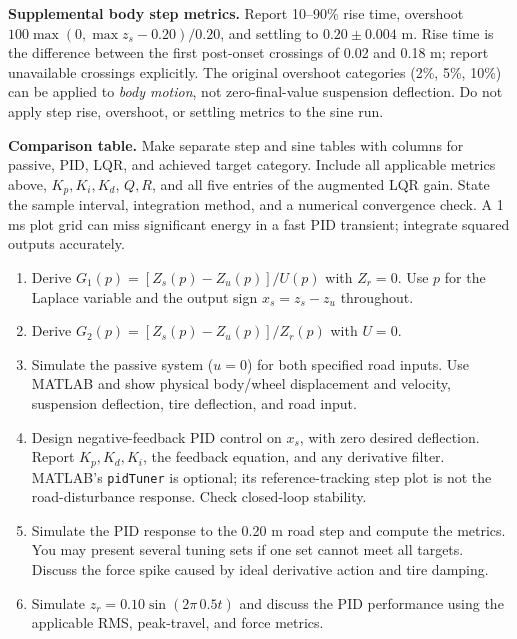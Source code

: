 \textbf{Supplemental body step metrics.} Report 10--90\% rise time, overshoot
$100\max(0,\max z_s-0.20)/0.20$, and settling to $0.20\pm0.004$ m.
Rise time is the difference between the first post-onset crossings of 0.02 and 0.18 m;
report unavailable crossings explicitly. The original overshoot categories (2\%, 5\%,
10\%) can be applied to \emph{body motion}, not zero-final-value suspension deflection.
Do not apply step rise, overshoot, or settling metrics to the sine run.

\textbf{Comparison table.} Make separate step and sine tables with columns for
passive, PID, LQR, and achieved target category. Include all applicable metrics above,
$K_p,K_i,K_d$, $Q,R$, and all five entries of the augmented LQR gain. State the sample
interval, integration method, and a numerical convergence check. A 1 ms plot grid can
miss significant energy in a fast PID transient; integrate squared outputs accurately.
\newpage
{}
\begin{enumerate}[label=\textbf{(\alph*)}]
\item Derive $G_1(p)=[Z_s(p)-Z_u(p)]/U(p)$ with $Z_r=0$.
Use $p$ for the Laplace variable and the output sign $x_s=z_s-z_u$ throughout.
\item Derive $G_2(p)=[Z_s(p)-Z_u(p)]/Z_r(p)$ with $U=0$.
\item Simulate the passive system ($u=0$) for both specified road inputs.
Use MATLAB and show physical body/wheel displacement and velocity, suspension
deflection, tire deflection, and road input.
\item Design negative-feedback PID control on $x_s$, with zero desired deflection.
Report $K_p,K_d,K_i$, the feedback equation, and any derivative filter.
MATLAB's \texttt{pidTuner} is optional; its reference-tracking step plot is not the
road-disturbance response. Check closed-loop stability.
\item Simulate the PID response to the 0.20 m road step and compute the metrics.
You may present several tuning sets if one set cannot meet all targets.
Discuss the force spike caused by ideal derivative action and tire damping.
\item Simulate $z_r=0.10\sin(2\pi\,0.5t)$ and discuss the PID performance using
the applicable RMS, peak-travel, and force metrics.
\end{enumerate}
